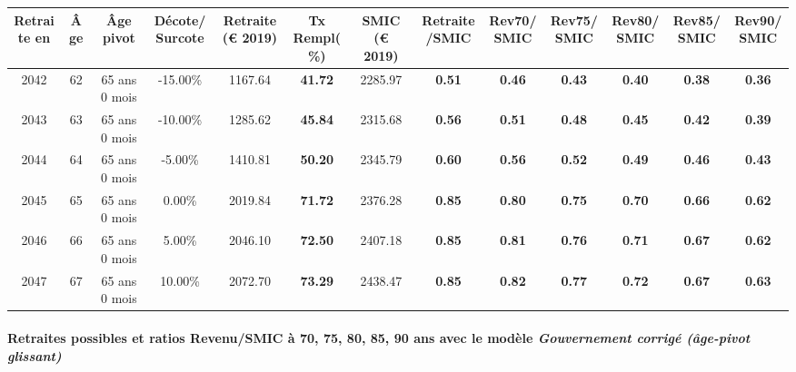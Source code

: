{ \scriptsize \begin{center} 
\begin{tabular}[htb]{|c|c||c|c||c|c||c||c|c|c|c|c|c|} 
\hline 
 Retraite en &  Âge &  Âge pivot &  Décote/Surcote &  Retraite (\euro{} 2019) &  Tx Rempl(\%) &  SMIC (\euro{} 2019) &  Retraite/SMIC &  Rev70/SMIC &  Rev75/SMIC &  Rev80/SMIC &  Rev85/SMIC &  Rev90/SMIC \\ 
\hline \hline 
 2042 &  62 &  65 ans 0 mois &  -15.00\% &  1167.64 &  {\bf 41.72} &  2285.97 &  {\bf {\color{red} 0.51}} &  {\bf {\color{red} 0.46}} &  {\bf {\color{red} 0.43}} &  {\bf {\color{red} 0.40}} &  {\bf {\color{red} 0.38}} &  {\bf {\color{red} 0.36}} \\ 
\hline 
 2043 &  63 &  65 ans 0 mois &  -10.00\% &  1285.62 &  {\bf 45.84} &  2315.68 &  {\bf {\color{red} 0.56}} &  {\bf {\color{red} 0.51}} &  {\bf {\color{red} 0.48}} &  {\bf {\color{red} 0.45}} &  {\bf {\color{red} 0.42}} &  {\bf {\color{red} 0.39}} \\ 
\hline 
 2044 &  64 &  65 ans 0 mois &  -5.00\% &  1410.81 &  {\bf 50.20} &  2345.79 &  {\bf {\color{red} 0.60}} &  {\bf {\color{red} 0.56}} &  {\bf {\color{red} 0.52}} &  {\bf {\color{red} 0.49}} &  {\bf {\color{red} 0.46}} &  {\bf {\color{red} 0.43}} \\ 
\hline 
 2045 &  65 &  65 ans 0 mois &  0.00\% &  2019.84 &  {\bf 71.72} &  2376.28 &  {\bf {\color{red} 0.85}} &  {\bf {\color{red} 0.80}} &  {\bf {\color{red} 0.75}} &  {\bf {\color{red} 0.70}} &  {\bf {\color{red} 0.66}} &  {\bf {\color{red} 0.62}} \\ 
\hline 
 2046 &  66 &  65 ans 0 mois &  5.00\% &  2046.10 &  {\bf 72.50} &  2407.18 &  {\bf {\color{red} 0.85}} &  {\bf {\color{red} 0.81}} &  {\bf {\color{red} 0.76}} &  {\bf {\color{red} 0.71}} &  {\bf {\color{red} 0.67}} &  {\bf {\color{red} 0.62}} \\ 
\hline 
 2047 &  67 &  65 ans 0 mois &  10.00\% &  2072.70 &  {\bf 73.29} &  2438.47 &  {\bf {\color{red} 0.85}} &  {\bf {\color{red} 0.82}} &  {\bf {\color{red} 0.77}} &  {\bf {\color{red} 0.72}} &  {\bf {\color{red} 0.67}} &  {\bf {\color{red} 0.63}} \\ 
\hline 
\hline 
\end{tabular} 
\end{center} } 
\paragraph{Retraites possibles et ratios Revenu/SMIC à 70, 75, 80, 85, 90 ans avec le modèle \emph{Gouvernement corrigé (âge-pivot glissant)}}  
 
